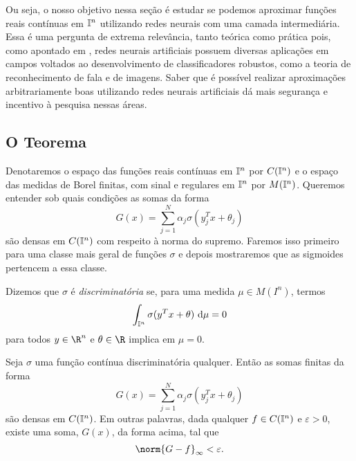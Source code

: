 Ou seja, o nosso objetivo nessa seção é estudar se podemos aproximar funções reais contínuas em \( \mathbb{I}^{ n } \) utilizando redes neurais com uma camada intermediária.
Essa é uma pergunta de extrema relevância, tanto teórica como prática pois, como apontado em \cite{lipmann}, redes neurais artificiais possuem diversas aplicações em campos voltados ao desenvolvimento de classificadores robustos, como a teoria de reconhecimento de fala e de imagens.
Saber que é possível realizar aproximações arbitrariamente boas utilizando redes neurais artificiais dá mais segurança e incentivo à pesquisa nessas áreas.

\subsection{O Teorema}

Denotaremos o espaço das funções reais contínuas em \( \mathbb{I}^{ n } \) por \( C(\mathbb{I}^{ n }) \) e o espaço das medidas de Borel finitas, com sinal e regulares em \( \mathbb{I}^{ n } \) por \( M(\mathbb{I}^{ n }) \).
Queremos entender sob quais condições as somas da forma \[
    G(x) = \sum_{ j=1 }^{ N } \alpha_{ j } \sigma(y_{ j }^{ T }x + \theta_{ j })
\]
são densas em \( C(\mathbb{I}^{ n }) \) com respeito à norma do supremo.
Faremos isso primeiro para uma classe mais geral de funções \( \sigma \) e depois mostraremos que as sigmoides pertencem a essa classe.

\begin{defn}
    Dizemos que \( \sigma \) é \emph{discriminatória} se, para uma medida \( \mu \in M(I^{ n }) \), termos
    \begin{equation}
        \int_{ \mathbb{I}^{ n } } \sigma(y^{ T }x + \theta)  \ \mathrm{d}\mu = 0
    \end{equation}
    para todos \( y \in \R^{ n } \) e \( \theta \in \R \) implica em \( \mu = 0 \).
\end{defn}

\begin{teo}
    Seja \( \sigma \) uma função contínua discriminatória qualquer.
    Então as somas finitas da forma
    \begin{equation}
        G(x) = \sum_{ j=1 }^{ N } \alpha_{ j } \sigma(y_{ j }^{ T }x + \theta_{ j })
    \end{equation}
    são densas em \( C(\mathbb{I}^{ n }) \).
    Em outras palavras, dada qualquer \( f \in C(\mathbb{I}^{ n }) \) e \( \varepsilon > 0 \), existe uma soma, \( G(x) \), da forma acima, tal que \[
        \norm{ G - f }_{ \infty } < \varepsilon
    .\]
\end{teo}



